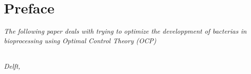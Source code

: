 \chapter*{Preface}

\emph{The following paper deals with trying to optimize the developpment of bacterias in bioprocessing using Optimal Control Theory (OCP)}

\begin{flushright}
{\makeatletter\itshape
    \@author \\
    Delft, \monthname{} \the\year{}
\makeatother}
\end{flushright}
